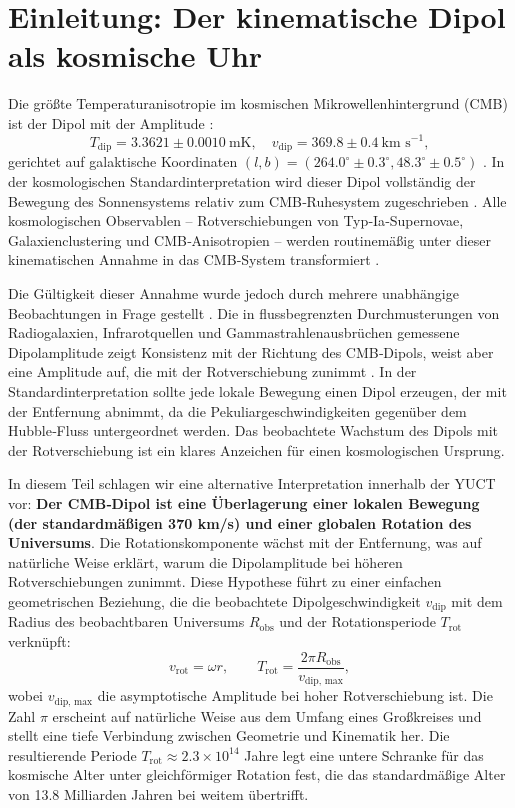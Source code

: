 \documentclass[11pt,a4paper]{article}
\begin{document}
	\section{Einleitung: Der kinematische Dipol als kosmische Uhr}
	
	Die größte Temperaturanisotropie im kosmischen Mikrowellenhintergrund (CMB) ist der Dipol mit der Amplitude \cite{Planck2018VI, Planck2018VII}:
	\begin{equation}
		T_{\text{dip}} = 3.3621 \pm 0.0010\ \text{mK}, \quad v_{\text{dip}} = 369.8 \pm 0.4\ \text{km s}^{-1},
	\end{equation}
	gerichtet auf galaktische Koordinaten \((l,b) = (264.0^\circ \pm 0.3^\circ, 48.3^\circ \pm 0.5^\circ)\) \cite{Planck2018I}. In der kosmologischen Standardinterpretation wird dieser Dipol vollständig der Bewegung des Sonnensystems relativ zum CMB‑Ruhesystem zugeschrieben \cite{PlanckIntLVI}. Alle kosmologischen Observablen – Rotverschiebungen von Typ‑Ia‑Supernovae, Galaxienclustering und CMB‑Anisotropien – werden routinemäßig unter dieser kinematischen Annahme in das CMB‑System transformiert \cite{Planck2018V,Planck2018VI}.
	
	Die Gültigkeit dieser Annahme wurde jedoch durch mehrere unabhängige Beobachtungen in Frage gestellt \cite{Gibelyou2012, Yoon2014}. Die in flussbegrenzten Durchmusterungen von Radiogalaxien, Infrarotquellen und Gammastrahlenausbrüchen gemessene Dipolamplitude zeigt Konsistenz mit der Richtung des CMB‑Dipols, weist aber eine Amplitude auf, die mit der Rotverschiebung zunimmt \cite{Bengaly2017, Siewert2021, Colin2017, Secrest2025}. In der Standardinterpretation sollte jede lokale Bewegung einen Dipol erzeugen, der mit der Entfernung abnimmt, da die Pekuliargeschwindigkeiten gegenüber dem Hubble‑Fluss untergeordnet werden. Das beobachtete Wachstum des Dipols mit der Rotverschiebung ist ein klares Anzeichen für einen kosmologischen Ursprung.
	
	In diesem Teil schlagen wir eine alternative Interpretation innerhalb der YUCT vor: \textbf{Der CMB‑Dipol ist eine Überlagerung einer lokalen Bewegung (der standardmäßigen 370 km/s) und einer globalen Rotation des Universums}. Die Rotationskomponente wächst mit der Entfernung, was auf natürliche Weise erklärt, warum die Dipolamplitude bei höheren Rotverschiebungen zunimmt. Diese Hypothese führt zu einer einfachen geometrischen Beziehung, die die beobachtete Dipolgeschwindigkeit \(v_{\text{dip}}\) mit dem Radius des beobachtbaren Universums \(R_{\text{obs}}\) und der Rotationsperiode \(T_{\text{rot}}\) verknüpft:
	\begin{equation}
		v_{\text{rot}} = \omega r, \qquad T_{\text{rot}} = \frac{2\pi R_{\text{obs}}}{v_{\text{dip, max}}},
	\end{equation}
	wobei \(v_{\text{dip, max}}\) die asymptotische Amplitude bei hoher Rotverschiebung ist. Die Zahl \(\pi\) erscheint auf natürliche Weise aus dem Umfang eines Großkreises und stellt eine tiefe Verbindung zwischen Geometrie und Kinematik her. Die resultierende Periode \(T_{\text{rot}} \approx 2.3 \times 10^{14}\) Jahre legt eine untere Schranke für das kosmische Alter unter gleichförmiger Rotation fest, die das standardmäßige Alter von 13.8 Milliarden Jahren bei weitem übertrifft.
	
\end{document}
